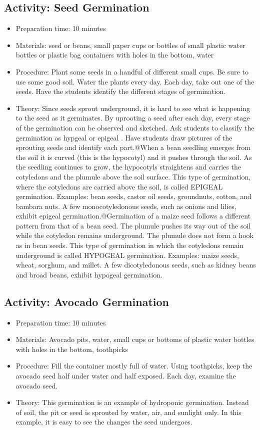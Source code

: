 \subsection{Activity: Seed Germination}
\begin{itemize}
\item{Preparation time: 10 minutes}
\item{Materials: seed or beans, small paper cups or bottles of small plastic water bottles or plastic bag containers with holes in the bottom, water}
\item{Procedure: Plant some seeds in a handful of different small cups. Be sure to use some good soil. Water the plants every day. Each day, take out one of the seeds. Have the students identify the different stages of germination.}
\item{Theory: Since seeds sprout underground, it is hard to see what is happening to the seed as it germinates. By uprooting a seed after each day, every stage of the germination can be observed and sketched. Ask students to classify the germination as hypgeal or epigeal . Have students draw pictures of the sprouting seeds and identify each part.@When a bean seedling emerges from the soil it is curved (this is the hypocotyl) and it pushes through the soil. As the seedling continues to grow, the hypocotyls straightens and carries the cotyledons and the plumule above the soil surface. This type of germination, where the cotyledons are carried above the soil, is called EPIGEAL germination. Examples: bean seeds, castor oil seeds, groundnuts, cotton, and bambara nuts. A few monocotyledonous seeds, such as onions and lilies, exhibit epigeal germination.@Germination of a maize seed follows a different pattern from that of a bean seed. The plumule pushes its way out of the soil while the cotyledon remains underground. The plumule does not form a hook as in bean seeds. This type of germination in which the cotyledons remain underground is called HYPOGEAL germination. Examples: maize seeds, wheat, sorghum, and millet. A few dicotyledonous seeds, such as kidney beans and broad beans, exhibit hypogeal germination.}
\end{itemize}

\subsection{Activity: Avocado Germination}
\begin{itemize}
\item{Preparation time: 10 minutes}
\item{Materials: Avocado pits, water, small cups or bottoms of plastic water bottles with holes in the bottom, toothpicks}
\item{Procedure: Fill the container mostly full of water. Using toothpicks, keep the avocado seed half under water and half exposed. Each day, examine the avocado seed.}
\item{Theory: This germination is an example of hydroponic germination. Instead of soil, the pit or seed is sprouted by water, air, and sunlight only. In this example, it is easy to see the changes the seed undergoes.}
\end{itemize}

